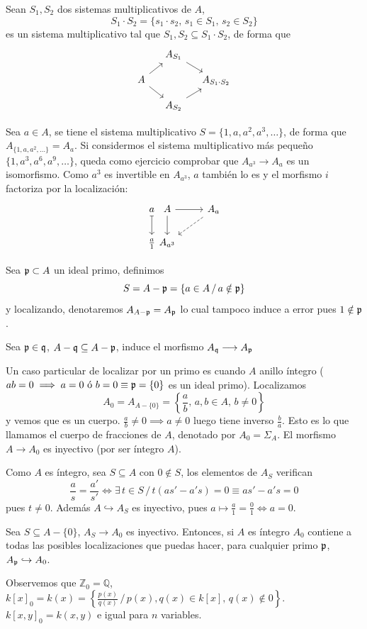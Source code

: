 Sean $S_1, S_2$ dos sistemas multiplicativos de $A$, 
$$S_1\cdot S_2 = \{s_1\cdot s_2, \, s_1 \in S_1, \, s_2\in S_2\}$$
es un sistema multiplicativo tal que $S_1, S_2 \subseteq S_1 \cdot S_2$, de forma que 
$$\bt[row sep=small, column sep=small] & A_{S_1} \arrow{rd} & \\ A \arrow{ur} \arrow{dr} & & A_{S_1\cdot S_2} \\ & A_{S_2} \arrow{ru} &  \et$$
\begin{ejem}
    Sea $a\in A$, se tiene el sistema multiplicativo $S= \{ 1, a, a^2, a^3, \ldots \}$, de forma que $A_{\{1,a,a^2, \ldots\}} = A_a$. Si considermos el sistema 
    multiplicativo m\'as pequeño $\{1, a^3, a^6, a^9, \ldots \}$, queda como ejercicio comprobar que $A_{a^3} \longrightarrow A_a$ es un isomorfismo. 
    Como $a^3$ es invertible en $A_{a^3}$, $a$ tambi\'en lo es y el morfismo $i$ factoriza por la localizaci\'on:
    $$\bt a \arrow[mapsto]{d} &[-10mm] A \arrow{d} \arrow{r} & A_a\arrow[dashed]{dl} \\ \frac{a}{1} & A_{a^3}  \et$$

    Sea $\mathfrak{p} \subset A$ un ideal primo, definimos 
    $$S = A - \mathfrak{p} = \{a\in A \, / \, a \notin \mathfrak{p}\}$$
    y localizando, denotaremos $A_{A-\mathfrak{p}} = A_{\mathfrak{p}}$ lo cual tampoco induce a error pues $1 \notin \mathfrak{p}$.

    Sea $\mathfrak{p} \in \mathfrak{q}$, $A-\mathfrak{q} \subseteq A-\mathfrak{p}$, induce el morfismo $A_{\mathfrak{q}} \longrightarrow A_{\mathfrak{p}}$

    Un caso particular de localizar por un primo es cuando $A$ anillo \'integro ($ab = 0 \implies a=0 \text{ \'o } b=0 \equiv \mathfrak{p}=\{0\}$ es un ideal primo). Localizamos
    $$A_0 = A_{A-\{0\}} = \left\{\frac{a}{b}, \, a,b\in A, \, b \neq 0\right\}$$
    y vemos que es un cuerpo. $\frac{a}{b} \neq 0 \implies a\neq 0$ luego tiene inverso $\frac{b}{a}$. Esto es lo que llamamos el cuerpo de fracciones de $A$, denotado por $A_0 = \Sigma_A$. El morfismo $A \longrightarrow A_0$ es inyectivo (por ser \'integro $A$). 

    Como $A$ es \'integro, sea $S\subseteq A$ con $0 \nin S$, los elementos de $A_S$ verifican
    $$\frac{a}{s} = \dfrac{a'}{s'} \iff \exists \, t \in S \, / \, t(as' -a's) = 0 \equiv as'-a's = 0$$
    pues $t\neq 0$. Adem\'as $A \hookrightarrow A_S$ es inyectivo, pues $a \longmapsto \frac{a}{1} = \frac{0}{1} \iff a=0$. 

    Sea $S \subseteq A-\{0\}$, $A_S \longrightarrow A_0$ es inyectivo. Entonces, si $A$ es \'integro $A_0$ contiene a todas las posibles localizaciones que puedas hacer, para cualquier primo $\mathfrak{p}$, $A_{\mathfrak{p}} \hookrightarrow A_0$. 

    Observemos que $\mathbb Z_0 = \mathbb Q$, $k[x]_0 = k(x) = \left\{ \frac{p(x)}{q(x)} \, / \, p(x), q(x) \in k[x], \, q(x) \nin 0 \right\}$. $k[x,y]_0=k(x,y)$ e igual para $n$ variables.  
\end{ejem}
\vfill \newpage
